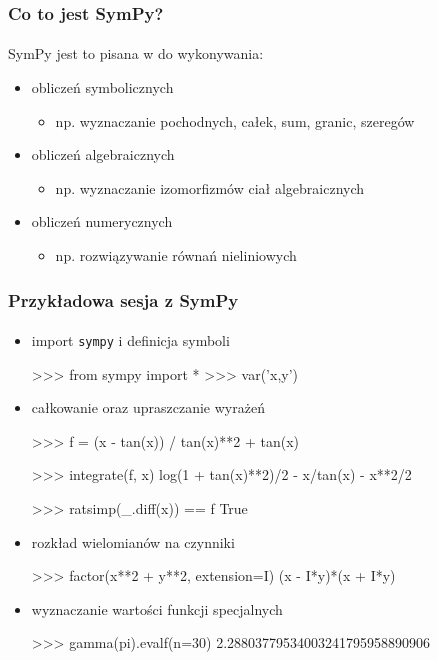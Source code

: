 \documentclass[10pt]{beamer}
\begin{document}
\begin{frame}[fragile]
    \frametitle{Co to jest SymPy?}
    \framesubtitle{}

    SymPy jest to  pisana w  do wykonywania:
    \begin{itemize}
        \pause
        \item obliczeń symbolicznych
            \begin{itemize}
                \item np. wyznaczanie pochodnych, całek, sum, granic, szeregów
            \end{itemize}
        \pause
        \item obliczeń algebraicznych
            \begin{itemize}
                \item np. wyznaczanie izomorfizmów ciał algebraicznych
            \end{itemize}
        \pause
        \item obliczeń numerycznych
            \begin{itemize}
                \item np. rozwiązywanie równań nieliniowych
            \end{itemize}
    \end{itemize}
\end{frame}

\begin{frame}[fragile]
    \frametitle{Przykładowa sesja z SymPy}
    \framesubtitle{}

    \begin{itemize}
        \item import \texttt{sympy} i definicja symboli
            \begin{python}
>>> from sympy import *
>>> var('x,y')
            \end{python}
        \pause
        \item całkowanie oraz upraszczanie wyrażeń
            \begin{python}
>>> f = (x - tan(x)) / tan(x)**2 + tan(x)

>>> integrate(f, x)
log(1 + tan(x)**2)/2 - x/tan(x) - x**2/2

>>> ratsimp(_.diff(x)) == f
True
            \end{python}
    \pause
        \item rozkład wielomianów na czynniki
            \begin{python}
>>> factor(x**2 + y**2, extension=I)
(x - I*y)*(x + I*y)
            \end{python}
        \pause
        \item wyznaczanie wartości funkcji specjalnych
            \begin{python}
>>> gamma(pi).evalf(n=30)
2.28803779534003241795958890906
            \end{python}
    \end{itemize}
\end{frame}
\end{document}

